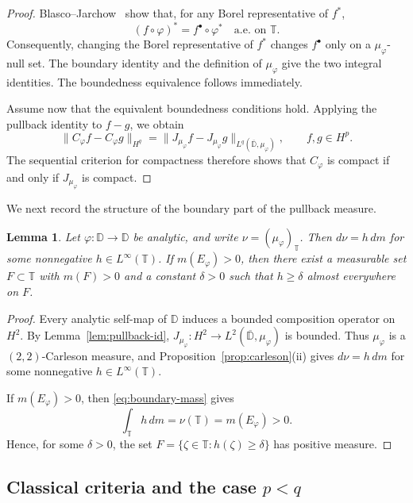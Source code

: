 \documentclass[11pt, reqno]{amsart}
\newtheorem{lemma}[theorem]{Lemma}
\theoremstyle{definition}
\theoremstyle{remark}
\newcommand{\D}{\mathbb{D}}
\newcommand{\T}{\mathbb{T}}
\begin{document}
\begin{proof}
Blasco--Jarchow~\cite[Section~1]{BlascoJarchow2005} show that, for any
Borel representative of \(f^*\),
\[
        (f\circ\varphi)^*
        =
        f^\bullet\circ\varphi^*
        \quad\text{a.e. on }\T.
\]
Consequently, changing the Borel representative of \(f^*\) changes
\(f^\bullet\) only on a \(\mu_\varphi\)-null set. The boundary identity
and the definition of \(\mu_\varphi\) give the two integral identities.
The boundedness equivalence follows immediately.

Assume now that the equivalent boundedness conditions hold. Applying
the pullback identity to \(f-g\), we obtain
\[
        \|C_\varphi f-C_\varphi g\|_{H^q}
        =
        \|J_{\mu_\varphi}f-J_{\mu_\varphi}g\|
        _{L^q(\overline{\D},\mu_\varphi)},
        \qquad
        f,g\in H^p.
\]
The sequential criterion for compactness therefore shows that
\(C_\varphi\) is compact if and only if \(J_{\mu_\varphi}\) is compact.
\end{proof}


We next record the structure of the boundary part of the pullback
measure.

\begin{lemma}
\label{lem:boundary-part}
Let \(\varphi:\D\to\D\) be analytic, and write
\(\nu=(\mu_\varphi)_{\T}\). Then \(d\nu=h\,dm\) for some
nonnegative \(h\in L^\infty(\T)\). If \(m(E_\varphi)>0\), then there
exist a measurable set \(F\subset\T\) with \(m(F)>0\) and a constant
\(\delta>0\) such that \(h\ge\delta\) almost everywhere on \(F\).
\end{lemma}

\begin{proof}
Every analytic self-map of \(\D\) induces a bounded composition
operator on \(H^2\). By Lemma~\ref{lem:pullback-id},
\(J_{\mu_\varphi}:H^2\to L^2(\overline{\D},\mu_\varphi)\) is bounded.
Thus \(\mu_\varphi\) is a \((2,2)\)-Carleson measure, and
Proposition~\ref{prop:carleson}\textup{(ii)} gives
\(d\nu=h\,dm\) for some nonnegative \(h\in L^\infty(\T)\).

If \(m(E_\varphi)>0\), then
\eqref{eq:boundary-mass} gives
\[
        \int_{\T} h\,dm
        =
        \nu(\T)
        =
        m(E_\varphi)
        >
        0.
\]
Hence, for some \(\delta>0\), the set
\(F=\{\zeta\in\T:h(\zeta)\ge\delta\}\) has positive measure.
\end{proof}

\subsection{Classical criteria and the case
\texorpdfstring{\(p<q\)}{p<q}}
\label{subsec:smoothing}
\end{document}
